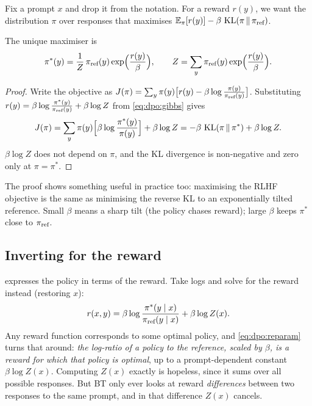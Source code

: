 Fix a prompt $x$ and drop it from the notation. For a reward $r(y)$, we want the distribution
$\pi$ over responses that maximises $\mathbb{E}_{\pi}[r(y)] - \beta\,\operatorname{KL}(\pi\,\|\,\pi_{\text{ref}})$.

\begin{proposition}\label{prop:dpo:gibbs}
The unique maximiser is
\begin{equation}
\pi^*(y) = \frac{1}{Z}\,\pi_{\text{ref}}(y)\exp\!\Big(\frac{r(y)}{\beta}\Big),\qquad
Z = \sum_{y}\pi_{\text{ref}}(y)\exp\!\Big(\frac{r(y)}{\beta}\Big).
\label{eq:dpo:gibbs}
\end{equation}
\end{proposition}
\begin{proof}
Write the objective as
$J(\pi)=\sum_y \pi(y)\big[r(y)-\beta\log\frac{\pi(y)}{\pi_{\text{ref}}(y)}\big]$. Substituting
$r(y)=\beta\log\frac{\pi^*(y)}{\pi_{\text{ref}}(y)}+\beta\log Z$ from \eqref{eq:dpo:gibbs} gives
\[
J(\pi)=\sum_y\pi(y)\Big[\beta\log\frac{\pi^*(y)}{\pi(y)}\Big]+\beta\log Z
      =-\beta\,\operatorname{KL}(\pi\,\|\,\pi^*)+\beta\log Z .
\]
$\beta\log Z$ does not depend on $\pi$, and the KL divergence is non-negative and zero only at
$\pi=\pi^*$.
\end{proof}

The proof shows something useful in practice too: maximising the RLHF objective is the same as
minimising the reverse KL to an exponentially tilted reference. Small $\beta$ means a sharp tilt
(the policy chases reward); large $\beta$ keeps $\pi^*$ close to $\pi_{\text{ref}}$.

\subsection{Inverting for the reward}

 expresses the policy in terms of the reward. Take logs and solve for the
reward instead (restoring $x$):
\begin{equation}
r(x,y) = \beta\log\frac{\pi^*(y\mid x)}{\pi_{\text{ref}}(y\mid x)} + \beta\log Z(x).
\label{eq:dpo:reparam}
\end{equation}
Any reward function corresponds to some optimal policy, and \eqref{eq:dpo:reparam} turns that
around: \emph{the log-ratio of a policy to the reference, scaled by $\beta$, is a reward for which
that policy is optimal}, up to a prompt-dependent constant $\beta\log Z(x)$. Computing $Z(x)$
exactly is hopeless, since it sums over all possible responses. But BT only ever looks at reward
\emph{differences} between two responses to the same prompt, and in that difference $Z(x)$
cancels.

